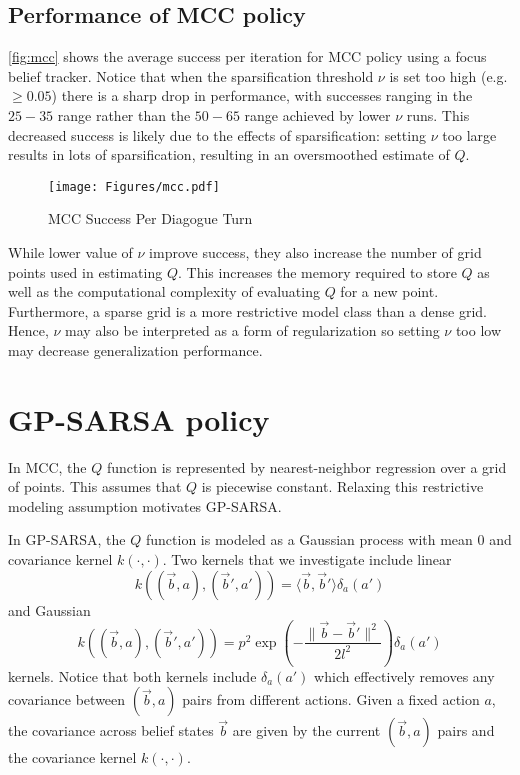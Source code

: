 \documentclass[a4paper,oneside,reqno]{amsart}
\begin{document}
\subsection{Performance of MCC policy}

\autoref{fig:mcc} shows the average success per iteration for MCC policy using
a focus belief tracker. Notice that when the sparsification threshold $\nu$ is
set too high (e.g. $\geq 0.05$) there is a sharp drop in performance, with
successes ranging in the $25-35$ range rather than the $50-65$ range achieved
by lower $\nu$ runs. This decreased success is likely due to the effects of
sparsification: setting $\nu$ too large results in lots of sparsification,
resulting in an oversmoothed estimate of $Q$.

\begin{figure}[ht!]
  \begin{center}
    \texttt{[image: Figures/mcc.pdf]}
  \end{center}
  \caption{MCC Success Per Diagogue Turn}
  \label{fig:mcc}
\end{figure}

While lower value of $\nu$ improve success, they also increase the number of
grid points used in estimating $Q$. This increases the memory required to store
$Q$ as well as the computational complexity of evaluating $Q$ for a new point.
Furthermore, a sparse grid is a more restrictive model class than a dense
grid. Hence, $\nu$ may also be interpreted as a form of regularization so setting
$\nu$ too low may decrease generalization performance.

\section{GP-SARSA policy}

In MCC, the $Q$ function is represented by nearest-neighbor regression over a
grid of points.  This assumes that $Q$ is piecewise constant. Relaxing this
restrictive modeling assumption motivates GP-SARSA.

In GP-SARSA, the $Q$ function is modeled as a Gaussian process with mean $0$
and covariance kernel $k(\cdot,\cdot)$. Two kernels that we investigate include
linear
\[
  k((\vec{b},a),(\vec{b}',a')) = \langle \vec{b}, \vec{b}'\rangle \delta_a(a')
\]
and Gaussian
\[
  k((\vec{b},a),(\vec{b}',a')) = p^2 \exp\left( -\frac{\|\vec{b} - \vec{b}'\|^2}{2l^2} \right) \delta_a(a')
\]
kernels. Notice that both kernels include $\delta_a(a')$ which effectively removes any
covariance between $(\vec{b},a)$ pairs from different actions. Given a fixed action $a$,
the covariance across belief states $\vec{b}$ are given by the current $(\vec{b},a)$ pairs
and the covariance kernel $k(\cdot, \cdot)$.
\end{document}
